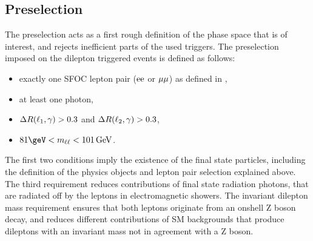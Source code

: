 \subsection{Preselection}
The preselection acts as a first rough definition of the phase space that is of interest, and rejects inefficient parts of the used triggers. The preselection imposed on the dilepton triggered events is defined as follows:
\begin{itemize}
 \item exactly one SFOC lepton pair ($\mathrm{e}\mathrm{e}$ or $\mu\mu$) as defined in ,
 \item at least one photon,
 \item $\Delta R(\ell_1,\gamma)>0.3$ and $\Delta R(\ell_2,\gamma)>0.3$,
 \item $81\geV<m_{\ell\ell}<101\GeV$.
\end{itemize}
The first two conditions imply the existence of the final state particles, including the definition of the physics objects and lepton pair selection explained above. The third requirement reduces contributions of final state radiation photons, that are radiated off by the leptons in electromagnetic showers. The invariant dilepton mass requirement ensures that both leptons originate from an onshell Z boson decay, and reduces different contributions of SM backgrounds that produce dileptons with an invariant mass not in agreement with a Z boson.
